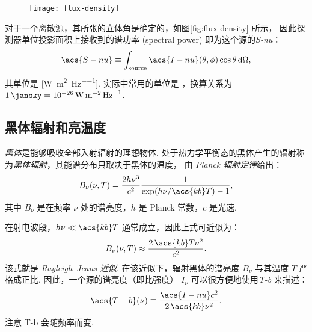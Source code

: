 \begin{figure}[htp]
  \centering
  \texttt{[image: flux-density]}
  \label{fig:flux-density}
\end{figure}

对于一个离散源，其所张的立体角是确定的，如图\autoref{fig:flux-density} 所示，
因此探测器单位投影面积上接收到的谱功率 (spectral power)
即为这个源的\emph{\acf{S-nu}}：
\begin{equation}
  \label{eq:flux-density}
  \acs{S-nu} \equiv
    \int_{\R{source}} \acs{I-nu}(\theta,\phi) \cos\theta \,\D{\Omega} ,
\end{equation}
其单位是 [\si{\watt\per\square\meter\per\hertz}].
实际中常用的单位是 \si{\jansky}，换算关系为
$\SI{1}{\jansky} = \SI{e-26}{\watt\per\square\meter\per\hertz}$.

\subsection{黑体辐射和亮温度}

\emph{黑体}是能够吸收全部入射辐射的理想物体.
处于热力学平衡态的黑体产生的辐射称为\emph{黑体辐射}，其能谱分布只取决于黑体的温度，
由 \emph{Planck 辐射定律}给出：
\begin{equation}
  \label{eq:planck}
  B_{\nu}(\nu, T) = \frac{2 h \nu^3}{c^2}
    \frac{1}{\exp(h \nu / \acs{kb} T) - 1} ,
\end{equation}
其中 $B_{\nu}$ 是在频率 $\nu$ 处的谱亮度，$h$ 是 Planck 常数，$c$ 是光速.

在射电波段，$h\nu \ll \acs{kb}T$ 通常成立，因此上式可近似为：
\begin{equation}
  \label{eq:rj-approx}
  B_{\nu}(\nu, T) \approx \frac{2\,\acs{kb}T \nu^2}{c^2} .
\end{equation}
该式就是 \emph{Rayleigh--Jeans 近似}.
在该近似下，辐射黑体的谱亮度 $B_{\nu}$ 与其温度 $T$ 严格成正比.
因此，一个源的谱亮度（即比强度） $I_{\nu}$
可以很方便地使用\emph{\acf{T-b}} 来描述：
\begin{equation}
  \label{eq:Tb}
  \acs{T-b}(\nu) \equiv \frac{\acs{I-nu} c^2}{2 \,\acs{kb} \nu^2} .
\end{equation}
注意 \acs{T-b} 会随频率而变.

